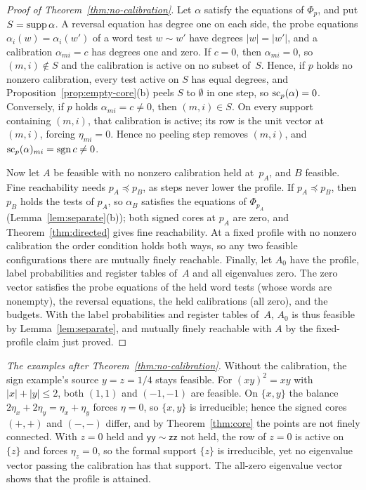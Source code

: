 \begin{proof}[Proof of Theorem~\ref{thm:no-calibration}]
Let $\alpha$ satisfy the equations of $\Phi_p$, and put $S=\operatorname{supp}\alpha$. A
reversal equation has degree one on each side, the probe equations
$\alpha_i(w)=\alpha_i(w')$ of a word test $w\sim w'$ have degrees
$|w|=|w'|$, and a calibration $\alpha_{mi}=c$ has degrees one and zero. If
$c=0$, then $\alpha_{mi}=0$, so $(m,i)\notin S$ and the calibration is
active on no subset of~$S$. Hence, if $p$ holds no nonzero calibration,
every test active on $S$ has equal degrees, and
Proposition~\ref{prop:empty-core}(b) peels $S$ to $\emptyset$ in one step,
so $\operatorname{sc}_p(\alpha)=0$. Conversely, if $p$ holds $\alpha_{mi}=c\neq0$, then
$(m,i)\in S$. On every support containing $(m,i)$, that calibration is
active; its row is the unit vector at $(m,i)$, forcing $\eta_{mi}=0$.
Hence no peeling step removes $(m,i)$, and $\operatorname{sc}_p(\alpha)_{mi}=\operatorname{sgn} c\neq0$.

Now let $A$ be feasible with no nonzero calibration held at~$p_A$, and $B$
feasible. Fine reachability needs $p_A\preceq p_B$, as steps never lower
the profile. If $p_A\preceq p_B$, then $p_B$ holds the tests of $p_A$, so
$\alpha_B$ satisfies the equations of $\Phi_{p_A}$
(Lemma~\ref{lem:separate}(b)); both signed cores at $p_A$ are zero, and
Theorem~\ref{thm:directed} gives fine reachability. At a fixed profile
with no nonzero calibration the order condition holds both ways, so any
two feasible configurations there are mutually finely reachable. Finally,
let $A_0$ have the profile, label probabilities and register tables of~$A$
and all eigenvalues zero. The zero vector satisfies the probe equations of
the held word tests (whose words are nonempty), the reversal equations,
the held calibrations (all zero), and the budgets. With the label
probabilities and register tables of~$A$, $A_0$ is thus feasible by
Lemma~\ref{lem:separate}, and mutually finely reachable with $A$ by the
fixed-profile claim just proved.
\end{proof}

\emph{The examples after Theorem~\ref{thm:no-calibration}.} Without the
calibration, the sign example's source $y=z=1/4$ stays feasible. For
$(xy)^2=xy$ with $|x|+|y|\le2$, both $(1,1)$ and $(-1,-1)$ are feasible.
On $\{x,y\}$ the balance $2\eta_x+2\eta_y=\eta_x+\eta_y$ forces $\eta=0$,
so $\{x,y\}$ is irreducible; hence the signed cores $(+,+)$ and $(-,-)$
differ, and by Theorem~\ref{thm:core} the points are not finely connected.
With $z=0$ held and $\mathsf{yy}\sim\mathsf{zz}$
not held, the row of $z=0$ is active on $\{z\}$ and forces $\eta_z=0$, so
the formal support $\{z\}$ is irreducible, yet no eigenvalue vector
passing the calibration has that support. The all-zero eigenvalue vector
shows that the profile is attained.

